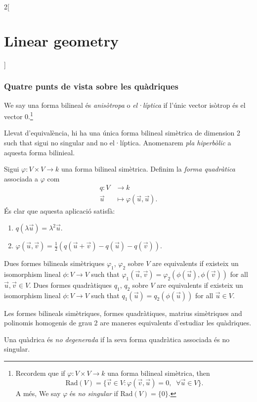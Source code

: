 \documentclass[class=article,10pt,crop=false]{standalone}
\begin{document}
\begin{multicols}{2}[\section{Linear geometry}]
\subsubsection{Quatre punts de vista sobre les quàdriques}
\begin{definition}
We say una forma bilineal és \textit{anisòtropa} o \textit{el·líptica} if l'únic vector isòtrop és el vector 0.\footnote{Recordem que if $\varphi:V\times V\rightarrow k$ una forma bilineal simètrica, then $$\text{Rad}(V)=\{\overrightarrow{v}\in V:\varphi(\overrightarrow{v},\overrightarrow{u})=0,\;\;\forall\overrightarrow{u}\in V\}.$$ A més, We say $\varphi$ és \textit{no singular} if $\text{Rad}(V)=\{0\}$.}
\end{definition}
\begin{theorem}
Llevat d'equivalència, hi ha una única forma bilineal simètrica de dimension 2 such that sigui no singular and no el·líptica. Anomenarem \textit{pla hiperbòlic} a aquesta forma bilinieal.
\end{theorem}
\begin{definition}
Sigui $\varphi:V\times V\rightarrow k$ una forma bilineal simètrica. Definim la \textit{forma quadràtica} associada a $\varphi$ com 
\begin{align*}
    q:V&\rightarrow k\\
    \overrightarrow{u}&\mapsto\varphi(\overrightarrow{u},\overrightarrow{u}).
\end{align*} És clar que aquesta aplicació satisfà:
\begin{enumerate}
    \item $q(\lambda\overrightarrow{u})=\lambda^2\overrightarrow{u}$.
    \item $\displaystyle\varphi(\overrightarrow{u},\overrightarrow{v})=\frac{1}{2}\left(q(\overrightarrow{u}+\overrightarrow{v})-q(\overrightarrow{u})-q(\overrightarrow{v})\right)$.
\end{enumerate}
\end{definition}
\begin{prop}
Dues formes bilineals simètriques $\varphi_1$, $\varphi_2$ sobre $V$ are equivalents if existeix un isomorphism lineal $\phi:V\rightarrow V$ such that $\varphi_1(\overrightarrow{u},\overrightarrow{v})=\varphi_2(\phi(\overrightarrow{u}),\phi(\overrightarrow{v}))$ for all $\overrightarrow{u},\overrightarrow{v}\in V$.\newline
Dues formes quadràtiques $q_1$, $q_2$ sobre $V$ are equivalents if existeix un isomorphism lineal $\phi:V\rightarrow V$ such that $q_1(\overrightarrow{u})=q_2(\phi(\overrightarrow{u}))$ for all $\overrightarrow{u}\in V$. 
\end{prop}
\begin{theorem}
Les formes bilineals simètriques, formes quadràtiques, matrius simètriques and polinomis homogenis de grau 2 are maneres equivalents d'estudiar les quàdriques.
\end{theorem}
\begin{definition}
Una quàdrica és \textit{no degenerada} if la seva forma quadràtica associada és no singular.
\end{definition}

\end{multicols}
\end{document}
